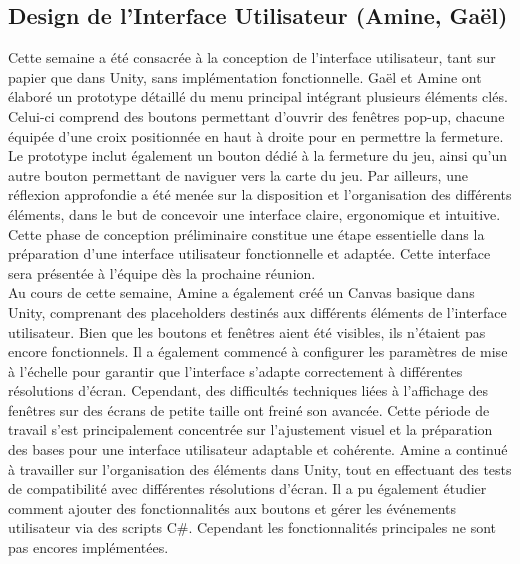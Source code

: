 \documentclass{report}
\begin{document}
\subsection*{Design de l'Interface Utilisateur (Amine, Gaël)}
Cette semaine a été consacrée à la conception de l’interface utilisateur, tant sur papier que dans Unity, sans implémentation fonctionnelle. Gaël et Amine ont élaboré un prototype détaillé du menu principal intégrant plusieurs éléments clés. Celui-ci comprend des boutons permettant d’ouvrir des fenêtres pop-up, chacune équipée d’une croix positionnée en haut à droite pour en permettre la fermeture. Le prototype inclut également un bouton dédié à la fermeture du jeu, ainsi qu’un autre bouton permettant de naviguer vers la carte du jeu. Par ailleurs, une réflexion approfondie a été menée sur la disposition et l’organisation des différents éléments, dans le but de concevoir une interface claire, ergonomique et intuitive. Cette phase de conception préliminaire constitue une étape essentielle dans la préparation d’une interface utilisateur fonctionnelle et adaptée. Cette interface sera présentée à l'équipe dès la prochaine réunion.
\\[0.4cm]
Au cours de cette semaine, Amine a également créé un Canvas basique dans Unity, comprenant des placeholders destinés aux différents éléments de l’interface utilisateur. Bien que les boutons et fenêtres aient été visibles, ils n’étaient pas encore fonctionnels. Il a également commencé à configurer les paramètres de mise à l’échelle pour garantir que l’interface s’adapte correctement à différentes résolutions d’écran. Cependant, des difficultés techniques liées à l’affichage des fenêtres sur des écrans de petite taille ont freiné son avancée. Cette période de travail s’est principalement concentrée sur l’ajustement visuel et la préparation des bases pour une interface utilisateur adaptable et cohérente. Amine a continué à travailler sur l’organisation des éléments dans Unity, tout en effectuant des tests de compatibilité avec différentes résolutions d’écran. Il a pu également étudier comment ajouter des fonctionnalités aux boutons et gérer les événements utilisateur via des scripts C\#. Cependant les fonctionnalités principales ne sont pas encores implémentées.


\newpage %
\end{document}
